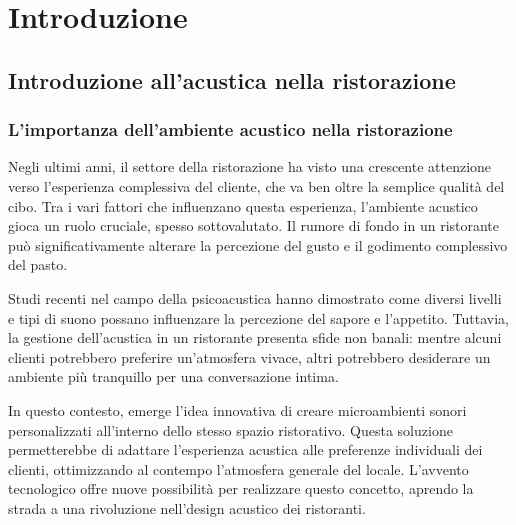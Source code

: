 
%

\chapter{Introduzione}
\label{cha:introduzione}


\section{Introduzione all’acustica nella ristorazione}

\subsection{L'importanza dell'ambiente acustico nella ristorazione}
\noindent

Negli ultimi anni, il settore della ristorazione ha visto una crescente attenzione verso l'esperienza complessiva del cliente, che va ben oltre la semplice qualità del cibo. Tra i vari fattori che influenzano questa esperienza, l'ambiente acustico gioca un ruolo cruciale, spesso sottovalutato. Il rumore di fondo in un ristorante può significativamente alterare la percezione del gusto e il godimento complessivo del pasto.

Studi recenti nel campo della psicoacustica hanno dimostrato come diversi livelli e tipi di suono possano influenzare la percezione del sapore e l'appetito. Tuttavia, la gestione dell'acustica in un ristorante presenta sfide non banali: mentre alcuni clienti potrebbero preferire un'atmosfera vivace, altri potrebbero desiderare un ambiente più tranquillo per una conversazione intima.

In questo contesto, emerge l'idea innovativa di creare microambienti sonori personalizzati all'interno dello stesso spazio ristorativo. Questa soluzione permetterebbe di adattare l'esperienza acustica alle preferenze individuali dei clienti, ottimizzando al contempo l'atmosfera generale del locale. L'avvento tecnologico offre nuove possibilità per realizzare questo concetto, aprendo la strada a una rivoluzione nell'design acustico dei ristoranti.

